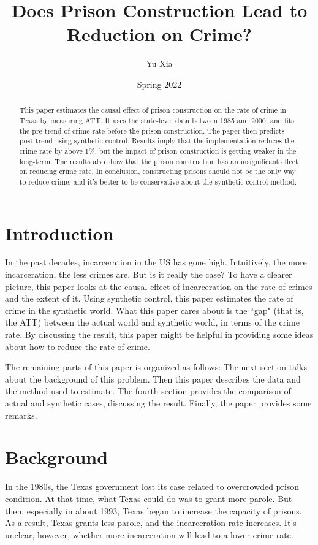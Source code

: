\documentclass{article}
\author{Yu Xia}
\title{Does Prison Construction Lead to Reduction on Crime?}
\date{Spring 2022}
\begin{document}
\maketitle

\nocite{*}

\begin{abstract}
    This paper estimates the causal effect of prison construction on the rate of crime in Texas by measuring ATT. It uses the state-level data between 1985 and 2000, and fits the pre-trend of crime rate before the prison construction. The paper then predicts post-trend using synthetic control. Results imply that the implementation reduces the crime rate by above 1\%, but the impact of prison construction is getting weaker in the long-term. The results also show that the prison construction has an insignificant effect on reducing crime rate. In conclusion, constructing prisons should not be the only way to reduce crime, and it's better to be conservative about the synthetic control method.
\end{abstract}

\section{Introduction}

In the past decades, incarceration in the US has gone high. Intuitively, the more incarceration, the less crimes are. But is it really the case? To have a clearer picture, this paper looks at the causal effect of incarceration on the rate of crimes and the extent of it. Using synthetic control, this paper estimates the rate of crime in the synthetic world. What this paper cares about is the ``gap" (that is, the ATT) between the actual world and synthetic world, in terms of the crime rate. By discussing the result, this paper might be helpful in providing some ideas about how to reduce the rate of crime. 

The remaining parts of this paper is organized as follows: The next section talks about the background of this problem. Then this paper describes the data and the method used to estimate. The fourth section provides the comparison of actual and synthetic cases, discussing the result. Finally, the paper provides some remarks.

\section{Background}

In the 1980s, the Texas government lost its case related to overcrowded prison condition. At that time, what Texas could do was to grant more parole. But then, especially in about 1993, Texas began to increase the capacity of prisons. As a result, Texas grants less parole, and the incarceration rate increases. It's unclear, however, whether more incarceration will lead to a lower crime rate. 
\end{document}
